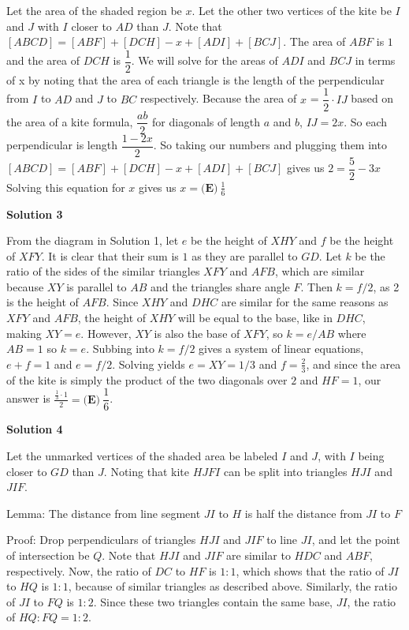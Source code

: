 \begin{enumerate}
Let the area of the shaded region be $x$. Let the other two vertices of the kite be $I$ and $J$ with $I$ closer to $AD$ than $J$. Note that $[ABCD] = [ABF] + [DCH] - x + [ADI] + [BCJ]$. The area of $ABF$ is $1$ and the area of $DCH$ is $\dfrac{1}{2}$. We will solve for the areas of $ADI$ and $BCJ$ in terms of x by noting that the area of each triangle is the length of the perpendicular from $I$ to $AD$ and $J$ to $BC$ respectively. Because the area of $x$ = $\dfrac{1}{2} \cdot IJ$ based on the area of a kite formula, $\dfrac{ab}{2}$ for diagonals of length $a$ and $b$, $IJ = 2x$. So each perpendicular is length $\dfrac{1-2x}{2}$. So taking our numbers and plugging them into  $[ABCD] =[ABF] + [DCH] - x + [ADI] + [BCJ]$ gives us $2 = \dfrac{5}{2} - 3x$ Solving this equation for $x$ gives us $x = \boxed{\textbf{(E)} \: \frac{1}{6}}$




\textbf{Solution 3}

From the diagram in Solution 1, let $e$ be the height of $XHY$ and $f$ be the height of $XFY$. It is clear that their sum is $1$ as they are parallel to $GD$. Let $k$ be the ratio of the sides of the similar triangles $XFY$ and $AFB$, which are similar because $XY$ is parallel to $AB$ and the triangles share angle $F$. Then $k = f/2$, as 2 is the height of $AFB$. Since $XHY$ and $DHC$ are similar for the same reasons as $XFY$ and $AFB$, the height of $XHY$ will be equal to the base, like in $DHC$, making $XY = e$. However, $XY$ is also the base of $XFY$, so $k = e / AB$ where $AB = 1$ so $k = e$. Subbing into $k = f/2$ gives a system of linear equations, $e + f = 1$ and $e = f/2$. Solving yields $e = XY = 1/3$ and $f = \frac{2}{3}$, and since the area of the kite is simply the product of the two diagonals over $2$ and $HF = 1$, our answer is $\frac{\frac{1}{3} \cdot 1}{2} = \boxed{\textbf{(E)} \: \dfrac16}$.

 



\textbf{Solution 4}

Let the unmarked vertices of the shaded area be labeled $I$ and $J$, with $I$ being closer to $GD$ than $J$. Noting that kite $HJFI$ can be split into triangles $HJI$ and $JIF$. 

 Lemma:  The distance from line segment $JI$ to $H$ is half the distance from $JI$ to $F$ 

 Proof: Drop perpendiculars of triangles $HJI$ and $JIF$ to line $JI$, and let the point of intersection be $Q$. Note that $HJI$ and $JIF$ are similar to $HDC$ and $ABF$, respectively. Now, the ratio of $DC$ to $HF$ is $1:1$, which shows that the ratio of $JI$ to $HQ$ is $1:1$, because of similar triangles as described above. Similarly, the ratio of $JI$ to $FQ$ is $1:2$. Since these two triangles contain the same base, $JI$, the ratio of $HQ:FQ = 1:2$.


\end{enumerate}
